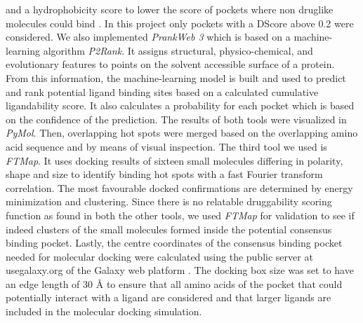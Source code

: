 \documentclass[11pt, letterpaper, titlepage]{article}
\renewcommand{\cite}{\parencite}
\begin{document}
and a hydrophobicity score to lower the score of pockets where non druglike molecules could bind \cite{Ricci_2022}. In this project only pockets with a \ac{DScore} above 0.2 were considered. 
We also implemented \textit{PrankWeb 3} which is based on a machine-learning algorithm \textit{P2Rank}. It assigns structural, physico-chemical, and evolutionary features to points on the solvent accessible surface of a protein. From this information, the machine-learning model is built and used to predict and rank potential ligand binding sites based on a calculated cumulative ligandability score. It also calculates a probability for each pocket which is based on the confidence of the prediction.
The results of both tools were visualized in \textit{PyMol}. Then, overlapping hot spots were merged based on the overlapping amino acid sequence and by means of visual inspection.
The third tool we used is \textit{FTMap}. It uses docking results of sixteen small molecules differing in polarity, shape and size to identify binding hot spots with a fast Fourier transform correlation. The most favourable docked confirmations are determined by energy minimization and clustering. Since there is no relatable druggability scoring function as found in both the other tools, we used \textit{FTMap} for validation to see if indeed clusters of the small molecules formed inside the potential consensus binding pocket.
Lastly, the centre coordinates of the consensus binding pocket needed for molecular docking were calculated using the public server at usegalaxy.org of the Galaxy web platform \cite{galaxy}. The docking box size was set to have an edge length of 30 {\AA} to ensure that all amino acids of the pocket that could potentially interact with a ligand are considered and that larger ligands are included in the molecular docking simulation.
\end{document}
